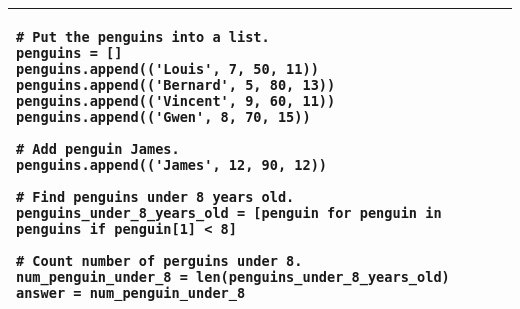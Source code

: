 \begin{table}[htbp]
\begin{tabular}{p{}}
\begin{verbatim}
# Put the penguins into a list.
penguins = []
penguins.append(('Louis', 7, 50, 11))
penguins.append(('Bernard', 5, 80, 13))
penguins.append(('Vincent', 9, 60, 11))
penguins.append(('Gwen', 8, 70, 15))

# Add penguin James.
penguins.append(('James', 12, 90, 12))

# Find penguins under 8 years old.
penguins_under_8_years_old = [penguin for penguin in penguins if penguin[1] < 8]

# Count number of perguins under 8.
num_penguin_under_8 = len(penguins_under_8_years_old)
answer = num_penguin_under_8
\end{verbatim}
\\
\bottomrule

\end{tabular}
\end{table}
